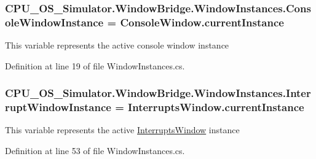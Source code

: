 \subsubsection[{Console\+Window\+Instance}]{ C\+P\+U\+\_\+\+O\+S\+\_\+\+Simulator.\+Window\+Bridge.\+Window\+Instances.\+Console\+Window\+Instance = {\bf Console\+Window.\+current\+Instance}\hspace{0.3cm}{\ttfamily [static]}}\label{class_c_p_u___o_s___simulator_1_1_window_bridge_1_1_window_instances_a90b746b2373f150cab75e4dee0f91c45}


This variable represents the active console window instance 



Definition at line 19 of file Window\+Instances.\+cs.

\hypertarget{class_c_p_u___o_s___simulator_1_1_window_bridge_1_1_window_instances_a63548e665d920e3a7aa8bc70a80ff229}{}
\subsubsection[{Interrupt\+Window\+Instance}]{ C\+P\+U\+\_\+\+O\+S\+\_\+\+Simulator.\+Window\+Bridge.\+Window\+Instances.\+Interrupt\+Window\+Instance = {\bf Interrupts\+Window.\+current\+Instance}\hspace{0.3cm}{\ttfamily [static]}}\label{class_c_p_u___o_s___simulator_1_1_window_bridge_1_1_window_instances_a63548e665d920e3a7aa8bc70a80ff229}


This variable represents the active \hyperlink{class_c_p_u___o_s___simulator_1_1_interrupts_window}{Interrupts\+Window} instance 



Definition at line 53 of file Window\+Instances.\+cs.

\hypertarget{class_c_p_u___o_s___simulator_1_1_window_bridge_1_1_window_instances_a84aad7db7b60a824217002ac7435f5dc}{}
